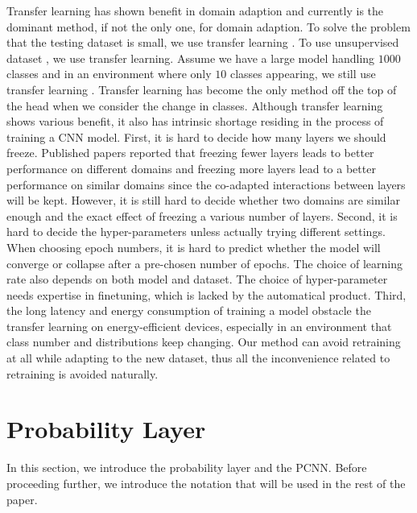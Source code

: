 \documentclass{article}
\begin{document}
Transfer learning has shown benefit in domain adaption and currently is the dominant method, if not the only one, for domain adaption. To solve the problem that the testing dataset is small, we use transfer learning \cite{oquab2014learning}. To use unsupervised dataset \cite{doersch2015unsupervised, noroozi2016unsupervised}, we use transfer learning. Assume we have a large model handling $1000$ classes and in an environment where only $10$ classes appearing, we still use transfer learning \cite{han2016mcdnn, shen2017fast}. Transfer learning has become the only method off the top of the head when we consider the change in classes. Although transfer learning shows various benefit, it also has intrinsic shortage residing in the process of training a CNN model. First, it is hard to decide how many layers we should freeze. Published papers \cite{yosinski2014transferable} reported that freezing fewer layers leads to better performance on different domains and freezing more layers lead to a better performance on similar domains since the co-adapted interactions between layers will be kept. However, it is still hard to decide whether two domains are similar enough and the exact effect of freezing a various number of layers. Second, it is hard to decide the hyper-parameters unless actually trying different settings. When choosing epoch numbers, it is hard to predict whether the model will converge or collapse after a pre-chosen number of epochs. The choice of learning rate also depends on both model and dataset. The choice of hyper-parameter needs expertise in finetuning, which is lacked by the automatical product. Third, the long latency and energy consumption of training a model obstacle the transfer learning on energy-efficient devices, especially in an environment that class number and distributions keep changing. Our method can avoid retraining at all while adapting to the new dataset, thus all the inconvenience related to retraining is avoided naturally.

\section{Probability Layer}
In this section, we introduce the probability layer and the PCNN. Before proceeding further, we introduce the notation that will be used in the rest of the paper.
\end{document}
